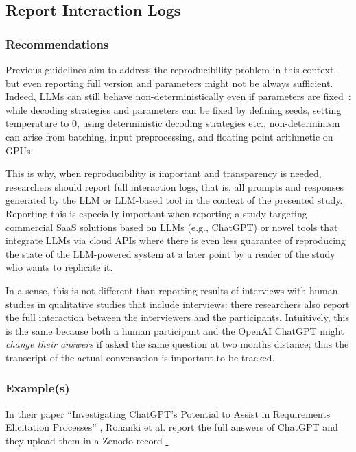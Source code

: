 



\subsection{Report Interaction Logs}

\subsubsection{Recommendations}

Previous guidelines aim to address the reproducibility problem in this context, but even reporting full version and parameters might not be always sufficient. Indeed, LLMs can still behave non-deterministically even if parameters are fixed~\cite{Chann2023}: while decoding strategies and parameters can be fixed by defining seeds, setting temperature to 0, using deterministic decoding strategies etc., non-determinism can arise from batching, input preprocessing, and floating point arithmetic on GPUs. 

This is why, when reproducibility is important and transparency is needed, researchers should report full interaction logs, that is, all prompts and responses generated by the LLM or LLM-based tool in the context of the presented study. 
Reporting this is especially important when reporting a study targeting commercial SaaS solutions based on LLMs (e.g., ChatGPT) or novel tools that integrate LLMs via cloud APIs where there is even less guarantee of reproducing the state of the LLM-powered system at a later point by a reader of the study who wants to replicate it. 

In a sense, this is not different than reporting results of interviews with human studies in qualitative studies that include interviews: there researchers also report the full interaction between the interviewers and the participants. Intuitively, this is the same because both a human participant and the OpenAI ChatGPT might {\em change their answers} if asked the same question at two months distance; thus the transcript of the actual conversation is important to be tracked.


\subsubsection{Example(s)}

In their paper ``Investigating ChatGPT's Potential to Assist in Requirements Elicitation Processes'' \cite{ronanki2023investigating}, Ronanki et al. report the full answers of ChatGPT and they upload them in a Zenodo record \href{https://zenodo.org/records/8124936}. 


